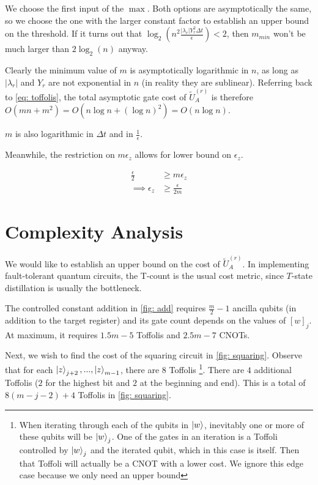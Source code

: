 We choose the first input of the $\max$. Both options are asymptotically the same, so we choose the one with the larger constant factor to establish an upper bound on the threshold. If it turns out that $\log_2\left(n^2\frac{|\lambda_r|Y_r^2\Delta t}{\epsilon}\right) < 2$, then $m_{min}$ won't be much larger than $2\log_2(n)$ anyway.

Clearly the minimum value of $m$ is asymptotically logarithmic in $n$, as long as $|\lambda_r|$ and $Y_r$ are not exponential in $n$ (in reality they are sublinear). Referring back to \eqref{eq: toffolis}, the total asymptotic gate cost of $\tilde{U}_A^{(r)}$ is therefore $O(mn + m^2) = O(n\log{n} + (\log{n})^2) = O(n\log{n})$.

$m$ is also logarithmic in $\Delta t$ and in $\frac{1}{\epsilon}$.

Meanwhile, the restriction on $m\epsilon_z$ allows for lower bound on $\epsilon_z$.

\begin{equation}
    \begin{split}
        \frac{\epsilon}{2} &\geq m\epsilon_z \\
        \implies \epsilon_z &\geq \frac{\epsilon}{2m} \label{eq: e_z}
    \end{split}
\end{equation}

\section{Complexity Analysis}

We would like to establish an upper bound on the cost of $\tilde{U}_A^{(r)}$. In implementing fault-tolerant quantum circuits, the T-count is the usual cost metric, since $T$-state distillation is usually the bottleneck.

The controlled constant addition in \ref{fig: add} requires $\frac{m}{2} - 1$ ancilla qubits (in addition to the target register) and its gate count depends on the values of $[w]_j$. At maximum, it requires $1.5m - 5$ Toffolis and $2.5m - 7$ CNOTs.

Next, we wish to find the cost of the squaring circuit in \ref{fig: squaring}. Observe that for each $\ket{z}_{j + 2}, ..., \ket{z}_{m - 1}$, there are $8$ Toffolis \footnote{When iterating through each of the qubits in $\ket{w}$, inevitably one or more of these qubits will be $\ket{w}_j$. One of the gates in an iteration is a Toffoli controlled by $\ket{w}_j$ and the iterated qubit, which in this case is itself. Then that Toffoli will actually be a CNOT with a lower cost. We ignore this edge case because we only need an upper bound}. There are $4$ additional Toffolis ($2$ for the highest bit and $2$ at the beginning and end). This is a total of $8(m - j - 2) + 4$ Toffolis in \ref{fig: squaring}.

